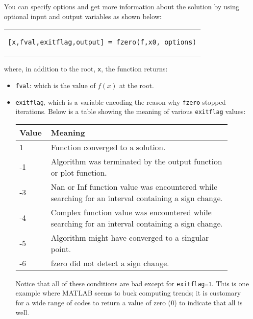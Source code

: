 You can specify options and get more information about the solution by using optional input and output variables as shown below:
\begin{center}
\begin{tabular}{c}
\begin{lstlisting}[style=myMatlab, frame=none, numbers=none, basicstyle=\large]
[x,fval,exitflag,output] = fzero(f,x0, options)
\end{lstlisting}
\end{tabular}
\end{center}
where, in addition to the root, \lstinline[style=myMatlab]{x}, the function returns:
\begin{itemize}
\item \lstinline[style=myMatlab]{fval}: which is the value of $f(x)$ at the root.

\item \lstinline[style=myMatlab]{exitflag}, which is a variable encoding the reason why \lstinline[style=myMatlab]{fzero} stopped iterations.  Below is a table showing the meaning of various \lstinline[style=myMatlab]{exitflag} values:

\begin{center}
\begin{tabular}{|p{0.1\linewidth} | p{0.8\linewidth}|}
\hline
\textbf{Value} & \textbf{Meaning} \\ \hline
1 & Function converged to a solution. \\
-1 & Algorithm was terminated by the output function or plot function. \\
-3 & Nan or Inf function value was encountered while searching for an interval containing a sign change. \\
-4 & Complex function value was encountered while searching for an interval containing a sign change. \\
-5 & Algorithm might have converged to a singular point. \\
-6 & fzero did not detect a sign change. \\
\hline
\end{tabular}
\end{center} 
Notice that all of these conditions are bad except for \lstinline[style=myMatlab]{exitflag=1}.  This is one example where MATLAB seems to buck computing trends; it is customary for a wide range of codes to return a value of zero (0) to indicate that all is well.  

\vspace{5.0cm}


\end{itemize}
